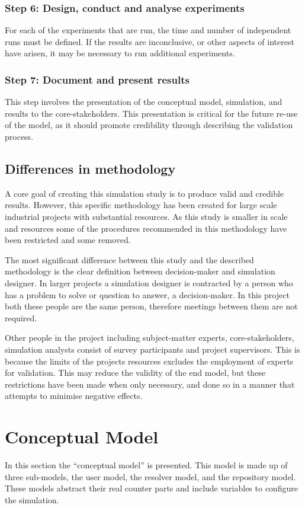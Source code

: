 \subsubsection{Step 6: Design, conduct and analyse experiments}
For each of the experiments that are run, the time and number of independent runs must be defined.
If the results are inconclusive, or other aspects of interest have arisen, it may be necessary to run additional experiments.

\subsubsection{Step 7: Document and present results}
This step involves the presentation of the conceptual model, simulation, and results to the core-stakeholders.
This presentation is critical for the future re-use of the model, as it should promote credibility through describing the validation process.

\subsection{Differences in methodology}
A core goal of creating this simulation study is to produce valid and credible results.
However, this specific methodology has been created for large scale industrial projects with substantial resources.
As this study is smaller in scale and resources some of the procedures recommended in this methodology have been restricted and some removed.

The most significant difference between this study and the described methodology is the clear definition between decision-maker and simulation designer.
In larger projects a simulation designer is contracted by a person who has a problem to solve or question to answer, a decision-maker.
In this project both these people are the same person, therefore meetings between them are not required.

Other people in the project including subject-matter experts, core-stakeholders, simulation analysts consist of survey participants and
project supervisors.
This is because the limits of the projects resources excludes the employment of experts for validation.
This may reduce the validity of the end model, but these restrictions have been made when only necessary,
and done so in a manner that attempts to minimise negative effects.

\section{Conceptual Model}
In this section the ``conceptual model'' is presented.
This model is made up of three sub-models, the user model, the resolver model, and the repository model.
These models abstract their real counter parts and include variables to configure the simulation.

